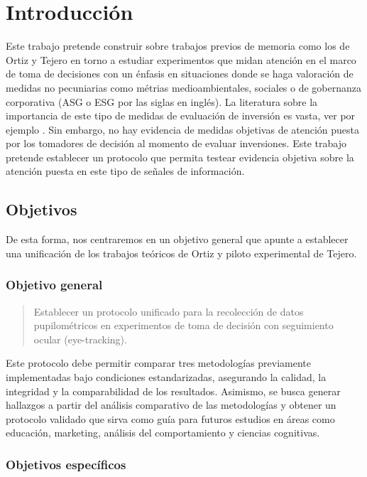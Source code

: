 
\chapter{Introducción}
\label{c1} %

Este trabajo pretende construir sobre trabajos previos de memoria como los de Ortiz y Tejero en torno a estudiar experimentos que midan atención en el marco de toma de decisiones con un énfasis en situaciones donde se haga valoración de medidas no pecuniarias como métrias medioambientales, sociales o de gobernanza corporativa (ASG o ESG por las siglas en inglés). La literatura sobre la importancia de este tipo de medidas de evaluación de inversión es vasta, ver por ejemplo . Sin embargo, no hay evidencia de medidas objetivas de atención puesta por los tomadores de decisión al momento de evaluar inversiones. Este trabajo pretende establecer un protocolo que permita testear evidencia objetiva sobre la atención puesta en este tipo de señales de información.

\section{Objetivos}

De esta forma, nos centraremos en un objetivo general que apunte a establecer una unificación de los trabajos teóricos de Ortiz y piloto experimental de Tejero.

\subsection{Objetivo general}

\begin{quote}
    Establecer un protocolo unificado para la recolección de datos pupilométricos en experimentos de toma de decisión con seguimiento ocular (eye-tracking).
\end{quote}

Este protocolo debe permitir comparar tres metodologías previamente implementadas bajo condiciones estandarizadas, asegurando la calidad, la integridad y la comparabilidad de los resultados. Asimismo, se busca generar hallazgos a partir del análisis comparativo de las metodologías y obtener un protocolo validado que sirva como guía para futuros estudios en áreas como educación, marketing, análisis del comportamiento y ciencias cognitivas.

\subsection{Objetivos específicos}


